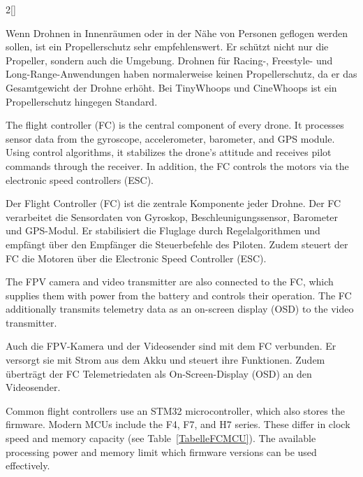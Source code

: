 \begin{paracol}{2}[]
\colger

Wenn Drohnen in Innenräumen oder in der Nähe von Personen geflogen werden sollen, ist ein Propellerschutz sehr empfehlenswert. Er schützt nicht nur die Propeller, sondern auch die Umgebung. Drohnen für Racing-, Freestyle- und Long-Range-Anwendungen haben normalerweise keinen Propellerschutz, da er das Gesamtgewicht der Drohne erhöht. Bei TinyWhoops und CineWhoops ist ein Propellerschutz hingegen Standard.

\colende

\renewcommand{\deutschertitel}{Flugcontroller und Motorsteuerung}
\renewcommand{\englischertitel}{Flight Controller and Electronic Speed Controller}
\makroabschnitt
\label{AbschnittFC}

The flight controller (FC) is the central component of every drone. It processes sensor data from the gyroscope, accelerometer, barometer, and GPS module. Using control algorithms, it stabilizes the drone’s attitude and receives pilot commands through the receiver. In addition, the FC controls the motors via the electronic speed controllers (ESC).

\colger

Der Flight Controller (FC) ist die zentrale Komponente jeder Drohne. Der FC verarbeitet die Sensordaten von Gyroskop, Beschleunigungssensor, Barometer und GPS-Modul. Er stabilisiert die Fluglage durch Regelalgorithmen und empfängt über den Empfänger die Steuerbefehle des Piloten. Zudem steuert der FC die Motoren über die Electronic Speed Controller (ESC).

\coleng

The FPV camera and video transmitter are also connected to the FC, which supplies them with power from the battery and controls their operation. The FC additionally transmits telemetry data as an on-screen display (OSD) to the video transmitter.

\colger

Auch die FPV-Kamera und der Videosender sind mit dem FC verbunden. Er versorgt sie mit Strom aus dem Akku und steuert ihre Funktionen. Zudem überträgt der FC Telemetriedaten als On-Screen-Display (OSD) an den Videosender.

\coleng

Common flight controllers use an STM32 microcontroller, which also stores the firmware. Modern MCUs include the F4, F7, and H7 series. These differ in clock speed and memory capacity (see Table~\ref{TabelleFCMCU}). The available processing power and memory limit which firmware versions can be used effectively.


\end{paracol}
